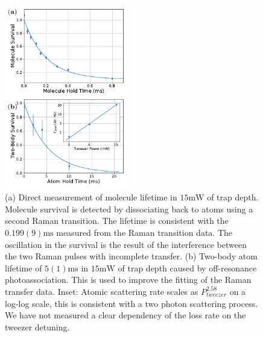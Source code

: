\documentclass[aps,prl,twocolumn,superscriptaddress]{revtex4-1}
\begin{document}

\begin{figure}[t!]
  \includegraphics[width=0.48\textwidth]{fig3.pdf}
  \caption{
    (a) Direct measurement of molecule lifetime in $15 \mathrm{mW}$ of trap depth.
    Molecule survival is detected by dissociating back to atoms using a second Raman transition.
    The lifetime is consistent with the $0.199(9) \mathrm{ms}$
    measured from the Raman transition data.
    The oscillation in the survival is the result of the interference
    between the two Raman pulses with incomplete transfer.
    (b) Two-body atom lifetime of $5(1) \mathrm{ms}$
    in $15 \mathrm{mW}$ of trap depth caused by off-resonance photoassociation.
    This is used to improve the fitting of the Raman transfer data.
    Inset: Atomic scattering rate scales as $P_{tweezer}^{2.58}$ on a log-log scale,
    this is consistent with a two photon scattering process.
    We have not measured a clear dependency of the loss rate on the tweezer detuning.
    \label{f-lifetime}}
\end{figure}

\end{document}
